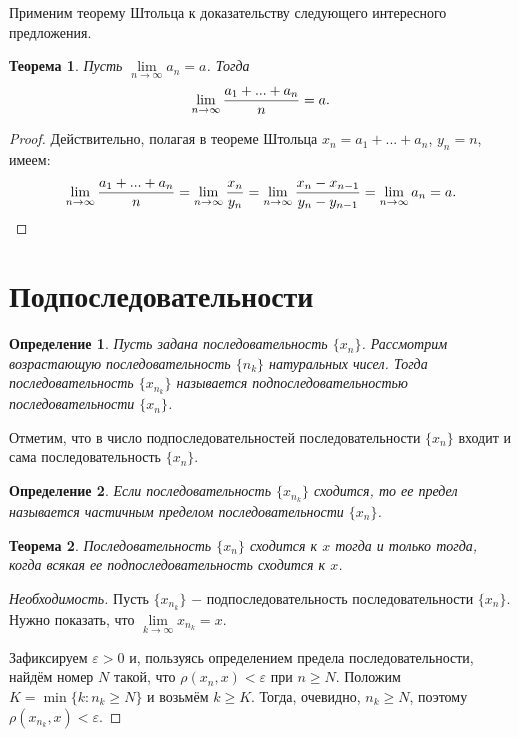 \documentclass{article}
\newtheorem{theorem}{Теорема}[section]
\newtheorem{definition}{Определение}[section]
\begin{document}
Применим теорему Штольца к доказательству следующего интересного предложения.

\begin{theorem}
Пусть \(\lim\limits_{n \to \infty}{a_n} = a\). Тогда
\[
\lim\limits_{n \to \infty}{{a_1 + ... + a_n} \over n} = a.
\]
\end{theorem}

\begin{proof}
Действительно, полагая в теореме Штольца \(x_n = a_1 + ... + a_n\), \(y_n = n\), имеем:
\[
\lim\limits_{n \to \infty}{{a_1 + ... + a_n} \over n} = \lim\limits_{n \to \infty}{x_n \over y_n} = \lim\limits_{n \to \infty}{{x_n - x_{n - 1}} \over {y_n - y_{n - 1}}} = \lim\limits_{n \to \infty}{a_n} = a.
\]
\end{proof}

\section{Подпоследовательности}

\begin{definition}
Пусть задана последовательность \(\{x_n\}\). Рассмотрим возрастающую последовательность \(\{n_k\}\) натуральных чисел. Тогда последовательность \(\{x_{n_k}\}\) называется подпоследовательностью последовательности \(\{x_n\}\).
\end{definition}

Отметим, что в число подпоследовательностей последовательности \(\{x_n\}\) входит и сама последовательность \(\{x_n\}\).

\begin{definition}
Если последовательность \(\{x_{n_k}\}\) сходится, то ее предел называется частичным пределом последовательности \(\{x_n\}\).
\end{definition}

\begin{theorem}
Последовательность \(\{x_n\}\) сходится к \(x\) тогда и только тогда, когда всякая ее подпоследовательность сходится к \(x\).
\end{theorem}

\begin{proof}[Необходимость]
Пусть \(\{x_{n_k}\}\) \(-\) подпоследовательность последовательности \(\{x_n\}\). Нужно показать, что \(\lim\limits_{k \to \infty}{x_{n_k}} = x\).

Зафиксируем \(\varepsilon > 0\) и, пользуясь определением предела последовательности, найдём номер \(N\) такой, что \(\rho(x_n, x) < \varepsilon\) при \(n \geq N\). Положим \(K = \min\{k : n_k \geq N\}\) и возьмём \(k \geq K\). Тогда, очевидно, \(n_k \geq N\), поэтому \(\rho(x_{n_k}, x) < \varepsilon\).
\end{proof}
\end{document}

